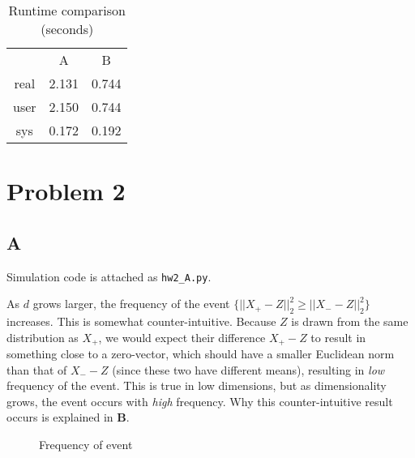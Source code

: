 \documentclass{article}
\begin{document}
\begin{center}
	\begin{table}[h]
		\centering
		\caption{Runtime comparison (seconds)}
		\begin{tabular}{|c c c|}
			\hline
			& A & B \\
			real & 2.131 & 0.744\\
			user & 2.150 & 0.744\\
			sys  & 0.172 & 0.192\\
			\hline
		\end{tabular}
	\end{table}
\end{center}



\section*{Problem 2}

\subsection*{A}

Simulation code is attached as \texttt{hw2\_A.py}. 

\smallskip

As $d$ grows larger, the frequency of the event $\{||X_+ -
Z||^2_2 \geq ||X_{-} - Z||_2^2\}$ increases. This is somewhat counter-intuitive.
Because $Z$ is drawn from the same distribution as $X_+$, we would expect their
difference $X_+ - Z$ to result in something close to a zero-vector, which should
have a smaller Euclidean norm than that of $X_- - Z$
(since these two have different
means), resulting in \textit{low} frequency of the event. This is true in low
dimensions, but as dimensionality grows, the event occurs with \textit{high}
frequency. Why this counter-intuitive result occurs is explained in \textbf{B}.

\begin{figure}[h!]
	\centering
	\caption{Frequency of event}
\end{figure}
\end{document}
